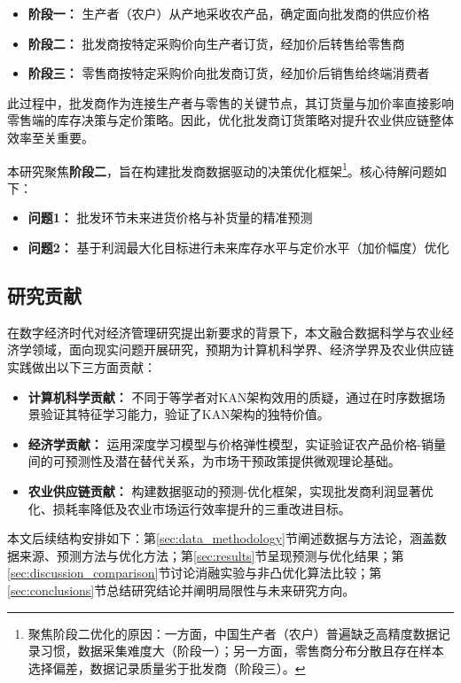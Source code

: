 \documentclass[lang=cn,12pt,a4paper]{elegantpaper}
\begin{document}
\begin{itemize}
  \item \textbf{阶段一：} 生产者（农户）从产地采收农产品，确定面向批发商的供应价格
  \item \textbf{阶段二：} 批发商按特定采购价向生产者订货，经加价后转售给零售商
  \item \textbf{阶段三：} 零售商按特定采购价向批发商订货，经加价后销售给终端消费者
\end{itemize}

此过程中，批发商作为连接生产者与零售的关键节点，其订货量与加价率直接影响零售端的库存决策与定价策略\citep{ke2018coordinating}。因此，优化批发商订货策略对提升农业供应链整体效率至关重要。

本研究聚焦\textbf{阶段二}，旨在构建批发商数据驱动的决策优化框架\footnote{
聚焦阶段二优化的原因：一方面，中国生产者（农户）普遍缺乏高精度数据记录习惯，数据采集难度大（阶段一）；另一方面，零售商分布分散且存在样本选择偏差，数据记录质量劣于批发商（阶段三）。
}。核心待解问题如下：

\begin{itemize}
  \item \textbf{问题1：} 批发环节未来进货价格与补货量的精准预测
  \item \textbf{问题2：} 基于利润最大化目标进行未来库存水平与定价水平（加价幅度）优化
\end{itemize}
\subsection{研究贡献}
\label{subsec:research_contribution}
在数字经济时代对经济管理研究提出新要求的背景下，本文融合数据科学与农业经济学领域，面向现实问题开展研究，预期为计算机科学界、经济学界及农业供应链实践做出以下三方面贡献：

\begin{itemize}
  \item \textbf{计算机科学贡献：} 不同于\citet{lee2025kolmogorov,shen2025reduced}等学者对KAN架构效用的质疑，通过在时序数据场景验证其特征学习能力，验证了KAN架构的独特价值。
  \item \textbf{经济学贡献：} 运用深度学习模型与价格弹性模型，实证验证农产品价格-销量间的可预测性及潜在替代关系，为市场干预政策提供微观理论基础。
  \item \textbf{农业供应链贡献：} 构建数据驱动的预测-优化框架，实现批发商利润显著优化、损耗率降低及农业市场运行效率提升的三重改进目标。
\end{itemize}

本文后续结构安排如下：第\ref{sec:data_methodology}节阐述数据与方法论，涵盖数据来源、预测方法与优化方法；第\ref{sec:results}节呈现预测与优化结果；第\ref{sec:discussion_comparison}节讨论消融实验与非凸优化算法比较；第\ref{sec:conclusions}节总结研究结论并阐明局限性与未来研究方向。
\end{document}
